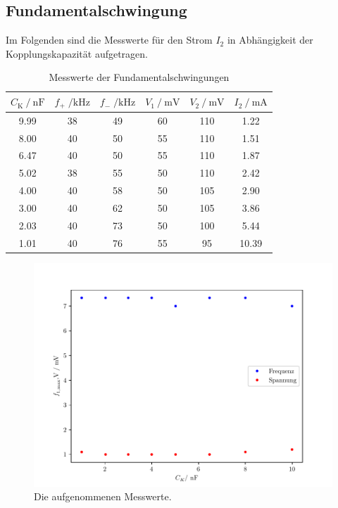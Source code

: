 \subsection{Fundamentalschwingung}
Im Folgenden sind die Messwerte für den Strom $I_2$ in Abhängigkeit der Kopplungskapazität aufgetragen.
\begin{table}[H]
  \centering
  \caption{Messwerte der Fundamentalschwingungen}
  \label{tab:aufgabeC}
  \begin{tabular}{c c c c c c}
      \toprule
      {$C_{\text{K}} \:/\: \si{\nano\farad}$} & {$f_+\;/ \si{\kilo\hertz}$} & {$f_-\;/ \si{\kilo\hertz}$} & {$V_1 \:/\: \si{\milli\volt}$} & {$V_2 \:/\: \si{\milli\volt}$} & $I_2 \:/\:\si{\milli\ampere}$ \\
      \midrule
      9.99 & 38 & 49 & 60 & 110 & 1.22 \\
      8.00 & 40 & 50 & 55 & 110 & 1.51 \\
      6.47 & 40 & 50 & 55 & 110 & 1.87 \\
      5.02 & 38 & 55 & 50 & 110 & 2.42 \\
      4.00 & 40 & 58 & 50 & 105 & 2.90 \\
      3.00 & 40 & 62 & 50 & 105 & 3.86 \\
      2.03 & 40 & 73 & 50 & 100 & 5.44 \\
      1.01 & 40 & 76 & 55 & 95 & 10.39 \\
      \bottomrule
  \end{tabular}
\end{table}


\begin{figure}[H]
  \centering
  \includegraphics{freq1.pdf}
  \caption{Die aufgenommenen Messwerte.}
  \label{fig:freq1}
\end{figure}

